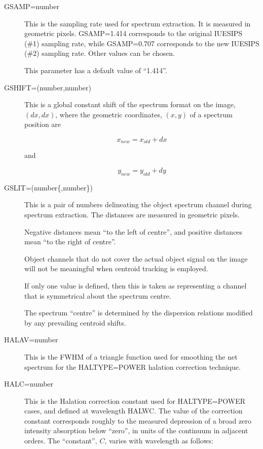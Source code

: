 \begin {description}
\item [GSAMP=number]
This is the sampling rate used for spectrum extraction.
It is measured in geometric pixels.
GSAMP=1.414 corresponds to the original IUESIPS (\#1) sampling
rate, while GSAMP=0.707 corresponds to the new IUESIPS (\#2) sampling
rate.
Other values can be chosen.

This parameter has a default value of ``1.414''.

\item [GSHIFT=(number,number)]
This is a global constant shift of the spectrum format on the image, 
$(dx,dx)$, where the geometric coordinates, $(x,y)$ of a spectrum position
are

\begin {equation}
x_{new} = x_{old} + dx
\end {equation}

and

\begin {equation}
y_{new} = y_{old} + dy
\end {equation}

\item [GSLIT=(number\{,number\})]
This is a pair of numbers delineating the object spectrum channel
during spectrum extraction.
The distances are measured in geometric pixels.

Negative distances mean ``to the left of centre'', and positive distances
mean ``to the right of centre''.

Object channels that do not cover the actual object signal on the
image will not be meaningful when centroid tracking is employed.

If only one value is defined, then this is taken as representing
a channel that is symmetrical about the spectrum centre.

The spectrum ``centre'' is determined by the dispersion relations 
modified by any prevailing centroid shifts.

\item [HALAV=number]
This is the FWHM of a triangle function used for smoothing the
net spectrum for the HALTYPE=POWER halation correction technique.

\item [HALC=number]
This is the Halation correction constant used for HALTYPE=POWER
cases, and defined at wavelength HALWC.
The value of the correction constant
corresponds roughly to the measured depression of a broad
zero intensity absorption below ``zero'', in units
of the continuum in adjacent orders.
The ``constant'', $C$, varies with wavelength as follows:


\end{description}
